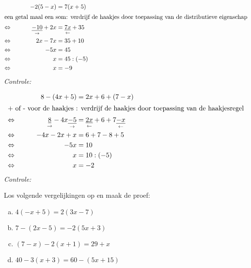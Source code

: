 \documentclass[12pt]{article}
\begin{document}
\begin{voorbeeld}
\begin{alignat*}{2}
     && - 2 (5 - x)	&= 7 (x + 5)\\
\intertext{een getal maal een som: verdrijf de haakjes door toepassing van de distributieve eigenschap}
\Leftrightarrow\mkern40mu && \underset{\rightarrow}{\underline{-10}} + 2x &= \underset{\leftarrow}{\underline{7x}} + 35 \\
\Leftrightarrow\mkern40mu && 2x - 7x	&= 35 + 10\\
\Leftrightarrow\mkern40mu && - 5x	&= 45\\
\Leftrightarrow\mkern40mu && x	&= 45 : (- 5) \\
\Leftrightarrow\mkern40mu && x &= -9
\end{alignat*}
{\em Controle: }\\
\end{voorbeeld}

\begin{voorbeeld}
\begin{alignat*}{2}
     && 8 - (4x + 5) &= 2x + 6 + (7 - x)\\
\intertext{+ of - voor de haakjes : verdrijf de haakjes door toepassing van de haakjesregel}
\Leftrightarrow\mkern40mu && \underset{\rightarrow}{\underline{8}}-4x\underset{\rightarrow}{\underline{-5}} &= \underset{\leftarrow}{\underline{2x}}+6+7\underset{\leftarrow}{\underline{-x}} \\
\Leftrightarrow\mkern40mu && 	- 4x - 2x + x	&= 6 + 7 - 8 + 5 \\
\Leftrightarrow\mkern40mu &&  - 5x	&= 10\\
\Leftrightarrow\mkern40mu &&  x	&= 10 : (- 5)\\
\Leftrightarrow\mkern40mu &&  x	&= - 2\\
\end{alignat*}
{\em Controle: }\\
\end{voorbeeld}

\begin{exercise}
Los volgende vergelijkingen op en maak de proef:
\begin{enumerate}[(a)]
  \item $4 (- x + 5) = 2 (3x - 7)$
  \item $7 - (2x - 5) = - 2 (5x + 3)$
  \item $(7 - x) - 2 (x + 1) = 29 + x$
  \item $40 - 3 (x + 3) = 60 - (5x + 15)$
\end{enumerate}
\end{exercise}
\end{document}
